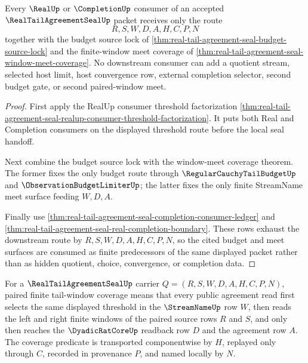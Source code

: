 \begin{theorem}
\label{thm:real-tail-agreement-seal-downstream-route-exhaustion}
Every $\RealUp$ or $\CompletionUp$ consumer of an accepted $\RealTailAgreementSealUp$ packet receives only the route
$$
R,S,W,D,A,H,C,P,N
$$
together with the budget source lock of \autoref{thm:real-tail-agreement-seal-budget-source-lock} and the finite-window meet coverage of \autoref{thm:real-tail-agreement-seal-window-meet-coverage}. No downstream consumer can add a quotient stream, selected host limit, host convergence row, external completion selector, second budget gate, or second paired-window meet.
\end{theorem}
\begin{proof}
First apply the RealUp consumer threshold factorization \autoref{thm:real-tail-agreement-seal-realup-consumer-threshold-factorization}. It puts both Real and Completion consumers on the displayed threshold route before the local seal handoff.

Next combine the budget source lock with the window-meet coverage theorem. The former fixes the only budget route through $\RegularCauchyTailBudgetUp$ and $\ObservationBudgetLimiterUp$; the latter fixes the only finite StreamName meet surface feeding $W,D,A$.

Finally use \autoref{thm:real-tail-agreement-seal-completion-consumer-ledger} and \autoref{thm:real-tail-agreement-seal-real-completion-boundary}. These rows exhaust the downstream route by $R,S,W,D,A,H,C,P,N$, so the cited budget and meet surfaces are consumed as finite predecessors of the same displayed packet rather than as hidden quotient, choice, convergence, or completion data.
\end{proof}

\begin{definition}
\label{def:real-tail-agreement-seal-window-coverage}
For a $\RealTailAgreementSealUp$ carrier $Q=(R,S,W,D,A,H,C,P,N)$, paired finite tail-window coverage means that every public agreement read first selects the same displayed threshold in the $\StreamNameUp$ row $W$, then reads the left and right finite windows of the paired source rows $R$ and $S$, and only then reaches the $\DyadicRatCoreUp$ readback row $D$ and the agreement row $A$. The coverage predicate is transported componentwise by $H$, replayed only through $C$, recorded in provenance $P$, and named locally by $N$.
\end{definition}

